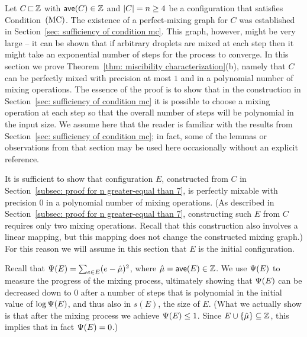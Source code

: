 
%

Let $C{\,\sqsubset\,}{\mathbb Z}$ with ${\textsf{ave}}(C)\in{\mathbb Z}$ and 
${|C|}=n \ge 4$ be a configuration that satisfies Condition~${\textrm{(MC)}}$.
The existence of a perfect-mixing graph for $C$ was established in 
Section~\ref{sec: sufficiency of condition mc}. This graph, however, might be very
large -- it can be shown that if arbitrary droplets are mixed at each step then
it might take an exponential number of steps for the process to converge.
In this section we prove Theorem~\ref{thm: miscibility characterization}(b),
namely that $C$ can be perfectly mixed
with precision at most $1$ and in a polynomial number of mixing operations. 
The essence of the proof is
to show that in the construction in  Section~\ref{sec: sufficiency of condition mc}
it is possible to choose a mixing operation at each step so that the overall
number of steps will be polynomial in the input size.
We assume here that the reader is familiar with the results from  Section~\ref{sec: sufficiency of condition mc};
in fact, some of the lemmas or observations from that section may be used here occasionally
without an explicit reference.

It is sufficient to show that configuration $E$, constructed from $C$ 
in Section~\ref{subsec: proof for n greater-equal than 7}, 
is perfectly mixable with precision $0$ in a polynomial number of mixing operations.
(As described in Section~\ref{subsec: proof for n greater-equal than 7},
constructing such $E$ from $C$ requires only two mixing operations. Recall that this
construction also involves a linear mapping, but this mapping does not change the
constructed mixing graph.)
For this reason we will assume in this section that $E$ is the initial configuration.

Recall that ${\Psi}(E)=\sum_{e\in E}(e-{\hat{\mu}})^2$, where
${\hat{\mu}} =  {\textsf{ave}}(E)\in{\mathbb Z}$. We use ${\Psi}(E)$ to measure the progress of
the mixing process, ultimately showing that ${\Psi}(E)$
can be decreased down to $0$ after a number of steps that is polynomial in  
the initial value of $\log{\Psi}(E)$, and thus also in $s(E)$, the size of $E$.
(What we actually show is that after the mixing process we achieve ${\Psi}(E)\leq 1$. 
Since $E\cup { \left\{ {\hat{\mu}}\right\} } \subseteq {\mathbb Z}$, this implies that in fact ${\Psi}(E)=0$.)

